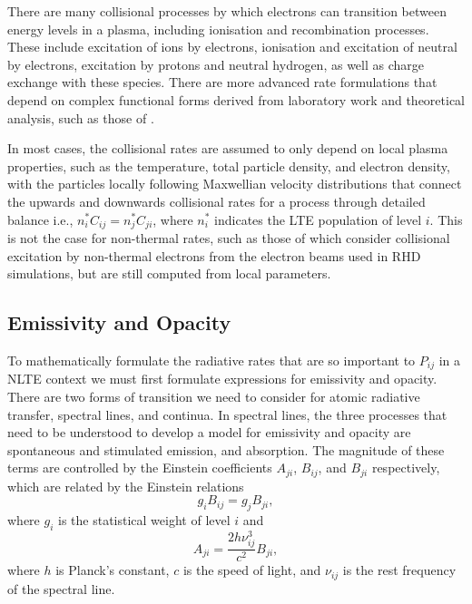 There are many collisional processes by which electrons can transition between energy levels in a plasma, including ionisation and recombination processes.
These include excitation of ions by electrons, ionisation and excitation of neutral by electrons, excitation by protons and neutral hydrogen, as well as charge exchange with these species.
There are more advanced rate formulations that depend on complex functional forms derived from laboratory work and theoretical analysis, such as those of \citet{Burgess1983, Arnaud1985}.

In most cases, the collisional rates are assumed to only depend on local plasma properties, such as the temperature, total particle density, and electron density, with the particles locally following Maxwellian velocity distributions that connect the upwards and downwards collisional rates for a process through detailed balance i.e., $n_i^* C_{ij} = n_j^* C_{ji}$, where $n_i^*$ indicates the LTE population of level $i$.
This is not the case for non-thermal rates, such as those of \citet{1993Fang} which consider collisional excitation by non-thermal electrons from the electron beams used in RHD simulations, but are still computed from local parameters.

\subsection{Emissivity and Opacity}

To mathematically formulate the radiative rates that are so important to $P_{ij}$ in a NLTE context we must first formulate expressions for emissivity and opacity.
There are two forms of transition we need to consider for atomic radiative transfer, spectral lines, and continua.
In spectral lines, the three processes that need to be understood to develop a model for emissivity and opacity are spontaneous and stimulated emission, and absorption.
The magnitude of these terms are controlled by the Einstein coefficients $A_{ji}$, $B_{ij}$, and $B_{ji}$ respectively, which are related by the Einstein relations
\begin{equation}
    g_i B_{ij} = g_j B_{ji},
\end{equation}
where $g_i$ is the statistical weight of level $i$ and
\begin{equation}
    A_{ji} = \frac{2h\nu_{ij}^3}{c^2}B_{ji},
\end{equation}
where $h$ is Planck's constant, $c$ is the speed of light, and $\nu_{ij}$ is the rest frequency of the spectral line.

